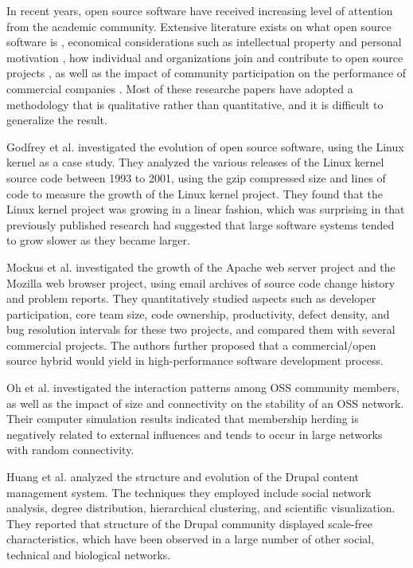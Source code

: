 \documentclass[conference]{IEEEtran}
\begin{document}
In recent years, open source software have received increasing level of attention from the academic community. Extensive literature exists on what open source software is \cite{g1}, economical considerations such as intellectual property and personal motivation \cite{g2}, how individual and organizations join and contribute to open source projects \cite{g3}, as well as the impact of community participation on the performance of commercial companies \cite{g4}. Most of these researche papers have adopted a methodology that is qualitative rather than quantitative, and it is difficult to generalize the result. 

Godfrey et al. \cite{c9} investigated the evolution of open source software, using the Linux kernel as a case study. They analyzed the various releases of the Linux kernel source code between 1993 to 2001, using the gzip compressed size and lines of code to measure the growth of the Linux kernel project. They found that the Linux kernel project was growing in a linear fashion, which was surprising in that previously published research had suggested that large software systems tended to grow slower as they became larger. 

Mockus et al. \cite{c10} investigated the growth of the Apache web server project and the Mozilla web browser project, using email archives of source code change history and problem reports. They quantitatively studied aspects such as developer participation, core team size, code ownership, productivity, defect density, and bug resolution intervals for these two projects, and compared them with several commercial projects. The authors further proposed that a commercial/open source hybrid would yield in high-performance software development process. 

Oh et al. \cite{c11} investigated the interaction patterns among OSS community members, as well as the impact of size and connectivity on the stability of an OSS network. Their computer simulation results indicated that membership herding is negatively related to external influences and tends to occur in large networks with random connectivity. 

Huang et al. \cite{c12} analyzed the structure and evolution of the Drupal content management system. The techniques they employed include social network analysis, degree distribution, hierarchical clustering, and scientific visualization. They reported that structure of the Drupal community displayed scale-free characteristics, which have been observed in a large number of other social, technical and biological networks. 
\end{document}
